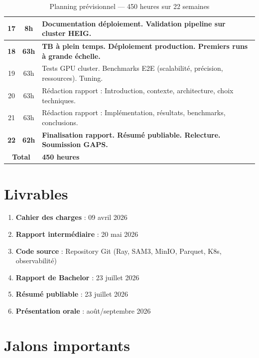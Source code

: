 \begin{table}[H]
\begin{tabular}{|c|c|p{9cm}|}
\hline
17 & 8h  & Documentation déploiement. Validation pipeline sur cluster HEIG. \\
\hline
\textbf{18} & \textbf{63h} & \textbf{TB à plein temps. Déploiement production. Premiers runs à grande échelle.} \\
\hline
19 & 63h & Tests GPU cluster. Benchmarks E2E (scalabilité, précision, ressources). Tuning. \\
\hline
20 & 63h & Rédaction rapport : Introduction, contexte, architecture, choix techniques. \\
\hline
21 & 63h & Rédaction rapport : Implémentation, résultats, benchmarks, conclusions. \\
\hline
\textbf{22} & \textbf{62h} & \textbf{Finalisation rapport. Résumé publiable. Relecture. Soumission GAPS.} \\
\hline
\multicolumn{2}{|c|}{\textbf{Total}} & \textbf{450 heures} \\
\hline
\end{tabular}
\caption{Planning prévisionnel --- 450 heures sur 22 semaines}
\label{tab:planning}
\end{table}

\section{Livrables}

\begin{enumerate}
    \item \textbf{Cahier des charges} : 09 avril 2026
    \item \textbf{Rapport intermédiaire} : 20 mai 2026
    \item \textbf{Code source} : Repository Git (Ray, SAM3, MinIO, Parquet, K8s, observabilité)
    \item \textbf{Rapport de Bachelor} : 23 juillet 2026
    \item \textbf{Résumé publiable} : 23 juillet 2026
    \item \textbf{Présentation orale} : août/septembre 2026
\end{enumerate}

\section{Jalons importants}

